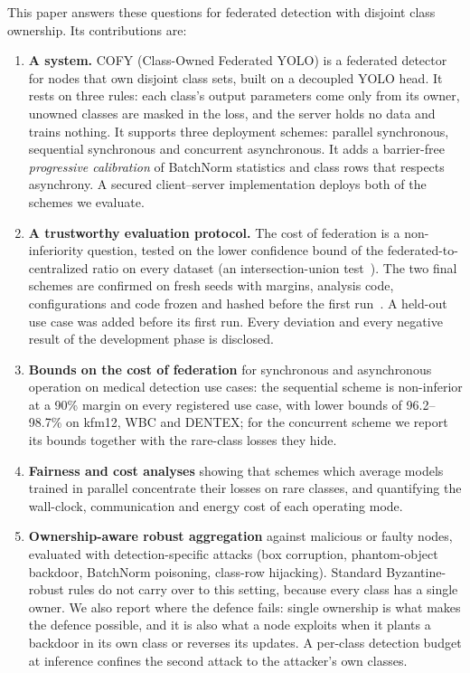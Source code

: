 \documentclass[pdflatex,sn-mathphys-num]{sn-jnl}
\newcommand{\sys}{COFY}
\begin{document}
This paper answers these questions for federated detection with disjoint class ownership. Its contributions are:
\begin{enumerate}
\item \textbf{A system.} \sys{} (Class-Owned Federated YOLO) is a federated detector for nodes that own disjoint class sets, built on a decoupled YOLO head. It rests on three rules: each class's output parameters come only from its owner, unowned classes are masked in the loss, and the server holds no data and trains nothing. It supports three deployment schemes: parallel synchronous, sequential synchronous and concurrent asynchronous. It adds a barrier-free \emph{progressive calibration} of BatchNorm statistics and class rows that respects asynchrony. A secured client--server implementation deploys both of the schemes we evaluate.
\item \textbf{A trustworthy evaluation protocol.} The cost of federation is a non-inferiority question, tested on the lower confidence bound of the federated-to-centralized ratio on every dataset (an intersection-union test~\cite{berger1996iut}). The two final schemes are confirmed on fresh seeds with margins, analysis code, configurations and code frozen and hashed before the first run~\cite{nosek2018prereg}. A held-out use case was added before its first run. Every deviation and every negative result of the development phase is disclosed.
\item \textbf{Bounds on the cost of federation} for synchronous and asynchronous operation on medical detection use cases: the sequential scheme is non-inferior at a 90\% margin on every registered use case, with lower bounds of 96.2--98.7\% on kfm12, WBC and DENTEX; for the concurrent scheme we report its bounds together with the rare-class losses they hide.
\item \textbf{Fairness and cost analyses} showing that schemes which average models trained in parallel concentrate their losses on rare classes, and quantifying the wall-clock, communication and energy cost of each operating mode.
\item \textbf{Ownership-aware robust aggregation} against malicious or faulty nodes, evaluated with detection-specific attacks (box corruption, phantom-object backdoor, BatchNorm poisoning, class-row hijacking). Standard Byzantine-robust rules do not carry over to this setting, because every class has a single owner. We also report where the defence fails: single ownership is what makes the defence possible, and it is also what a node exploits when it plants a backdoor in its own class or reverses its updates. A per-class detection budget at inference confines the second attack to the attacker's own classes.
\end{enumerate}
\end{document}
